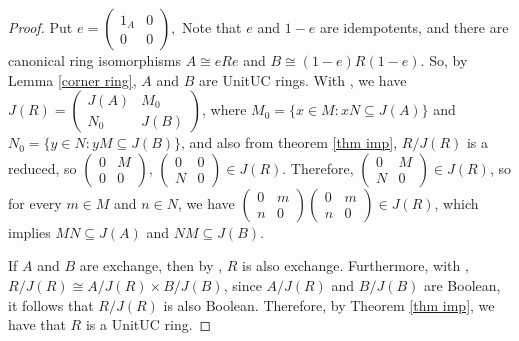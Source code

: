 \documentclass[12pt]{amsart}
\theoremstyle{definition}
\begin{document}
\begin{proof}
Put $e= \begin{pmatrix}
    1_A & 0 \\ 0 & 0
\end{pmatrix},$ 
Note that $e$ and $1 - e$ are idempotents, and there are canonical ring isomorphisms $A \cong eRe$ and $B \cong (1 - e)R(1 - e)$. So, by Lemma \ref{corner ring}, $A$ and $B$ are   UnitUC rings. With \cite[Theorem 2.5]{tang}, we have $J(R) = \begin{pmatrix}
   J(A) & M_0\\ N_0 & J(B) 
\end{pmatrix}$, where $M_0 = \{x \in M : xN \subseteq J(A)\}$ and $N_0 =\{ y \in N : yM \subseteq J(B)\}$, and also from theorem \ref{thm imp}, $ R/J(R)$ is a reduced, so $\begin{pmatrix}
   0 & M\\ 0 & 0 
\end{pmatrix}$, $\begin{pmatrix}
   0 & 0 \\ N & 0 
\end{pmatrix} \in J(R)$. Therefore, $\begin{pmatrix}
   0 & M\\ N & 0 
\end{pmatrix} \in J(R)$, so for every $m \in M$ and $n \in N$, we have $\begin{pmatrix} 0 & m\\ n & 0  \end{pmatrix}\begin{pmatrix} 0 & m\\ n & 0  \end{pmatrix} \in J(R)$, which implies $MN \subseteq J(A)$ and $NM \subseteq J(B)$.

If $A$ and $B$ are exchange, then by \cite[Theorem 2.7(1)]{tang}, $R$ is also exchange. Furthermore, with \cite[Lemma 3.1(1)]{tang}, $R/J(R) \cong A/J(R) \times B/J(B)$, since $A/J(R)$ and $B/J(B)$ are Boolean, it follows that $R/J(R)$ is also Boolean. Therefore, by Theorem \ref{thm imp}, we have that $R$ is a   UnitUC ring.

\end{proof}
\end{document}

